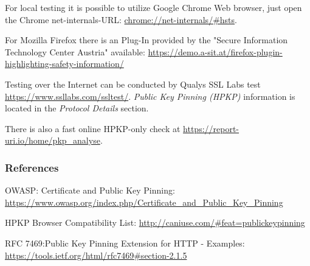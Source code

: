 For local testing it is possible to utilize Google Chrome Web browser, just open the Chrome net-internals-URL: \url{chrome://net-internals/#hsts}.

For Mozilla Firefox there is an Plug-In provided by the "Secure Information Technology Center Austria" available: \url{https://demo.a-sit.at/firefox-plugin-highlighting-safety-information/}

Testing over the Internet can be conducted by Qualys SSL Labs test \url{https://www.ssllabs.com/ssltest/}. \emph{Public Key Pinning (HPKP)} information is located in the \emph{Protocol Details} section. 

There is also a fast online HPKP-only check at \url{https://report-uri.io/home/pkp_analyse}.

\subsubsection{References}
\begin{itemize*}
	\item OWASP: Certificate and Public Key Pinning: \url{https://www.owasp.org/index.php/Certificate_and_Public_Key_Pinning}
	\item HPKP Browser Compatibility List: \url{http://caniuse.com/\#feat=publickeypinning}
  \item RFC 7469:Public Key Pinning Extension for HTTP - Examples: \url{https://tools.ietf.org/html/rfc7469\#section-2.1.5}
\end{itemize*}



